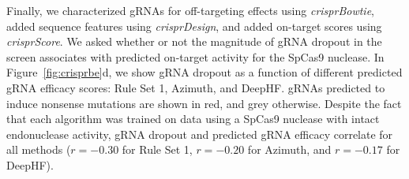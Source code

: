 \documentclass[pdftex,english,10pt]{article}
\begin{document}
Finally, we characterized gRNAs for off-targeting effects using \textit{crisprBowtie}, added sequence features using \textit{crisprDesign}, and added on-target scores using \textit{crisprScore}. We asked whether or not the magnitude of gRNA dropout in the screen associates with predicted on-target activity for the SpCas9 nuclease. In Figure~\ref{fig:crisprbe}d, we show gRNA dropout as a function of different predicted gRNA efficacy scores: Rule Set 1, Azimuth, and DeepHF. 
gRNAs predicted to induce nonsense mutations are shown in red, and grey otherwise. Despite the fact that each algorithm was trained on data using a SpCas9 nuclease with intact endonuclease activity, gRNA dropout and predicted gRNA efficacy correlate for all methods ($r = -0.30$ for Rule Set 1, $r =  -0.20$ for Azimuth, and $r = -0.17$ for DeepHF). 
\end{document}
